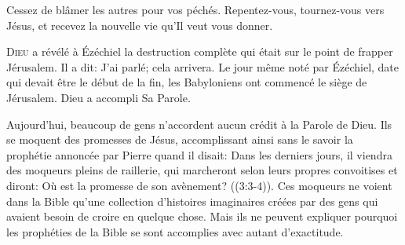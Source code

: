Cessez de blâmer les autres pour vos péchés.
 Repentez-vous, tournez-vous vers Jésus,
 et recevez la nouvelle vie qu'Il veut vous donner. 

\dvrule







\lettrine{D}{ieu} a révélé à Ézéchiel la destruction complète
 qui était sur le point de frapper Jérusalem. Il a dit: 
 \Og J'ai parlé; cela arrivera. \Fg{}
 Le jour même noté par Ézéchiel, date qui devait être le début de la fin,
 les Babyloniens ont commencé le siège de Jérusalem. Dieu a accompli Sa Parole. 


Aujourd'hui, beaucoup de gens n'accordent aucun crédit à la Parole de Dieu.
 Ils se moquent des promesses de Jésus, accomplissant ainsi sans le savoir
 la prophétie annoncée par Pierre quand il disait: 
 \Og Dans les derniers jours, il viendra des moqueurs pleins de raillerie,
 qui marcheront selon leurs propres convoitises et diront:
 Où est la promesse de son avènement? \Fg{}
 ((3:3-4)).
 Ces moqueurs ne voient dans la Bible qu'une collection d'histoires imaginaires
 créées par des gens qui avaient besoin de croire en quelque chose.
 Mais ils ne peuvent expliquer pourquoi les prophéties de la Bible
 se sont accomplies avec autant d'exactitude. 


